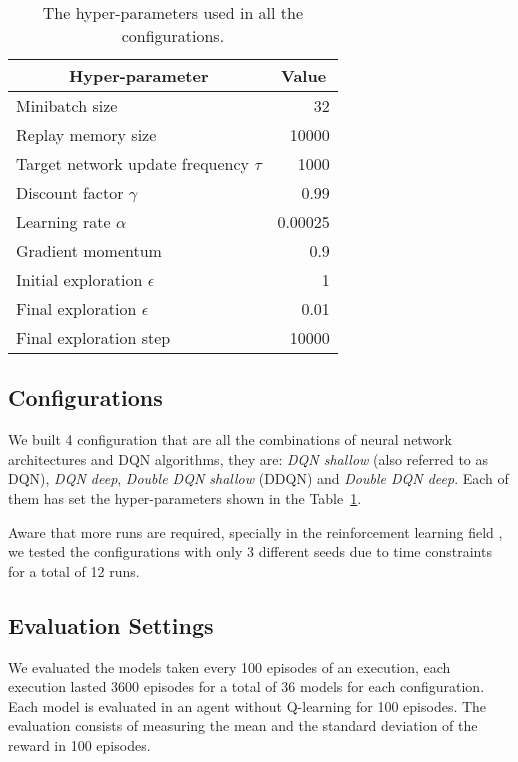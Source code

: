 \begin{table}
	\centering
	\begin{tabular}{|l|r|}
		\hline
		\multicolumn{1}{|c|}{\textbf{Hyper-parameter}} &
		\multicolumn{1}{|c|}{\textbf{Value}}        \\
		\hline
		Minibatch size & 32 \\
		Replay memory size & 10000 \\
		Target network update frequency $\tau$ & 1000 \\
		Discount factor $\gamma$ & 0.99 \\
		Learning rate $\alpha$ & 0.00025 \\
		Gradient momentum & 0.9 \\
		Initial exploration $\epsilon$ & 1 \\
		Final exploration $\epsilon$ & 0.01 \\
		Final exploration step & 10000 \\
		\hline
	\end{tabular}
	
	\caption{The hyper-parameters used in all the configurations.}
	\label{tab:my-hyperparams}
\end{table}

\subsection{Configurations}

We built 4 configuration that are all the combinations of neural network architectures and DQN algorithms, they are: \textit{DQN shallow} (also referred to as DQN), \textit{DQN deep}, \textit{Double DQN shallow} (DDQN) and \textit{Double DQN deep}. Each of them has set the hyper-parameters shown in the Table~\ref{tab:my-hyperparams}.

Aware that more runs are required, specially in the reinforcement learning field \cite{DBLP:journals/corr/abs-1709-06560}, we tested the configurations with only 3 different seeds due to time constraints for a total of 12 runs.


\subsection{Evaluation Settings}

We evaluated the models taken every 100 episodes of an execution, each execution lasted 3600 episodes for a total of 36 models for each configuration. Each model is evaluated in an agent without Q-learning for 100 episodes. The evaluation consists of measuring the mean and the standard deviation of the reward in 100 episodes.




